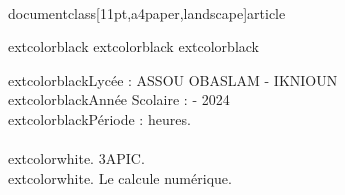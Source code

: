 \\documentclass[11pt,a4paper,landscape]{article}
\begin{document}
extcolor{black}{}
\hfill
extcolor{black}{}
\hfill  
extcolor{black}{}
\begin{boxone}
\begin{multicols}{2} 
extcolor{black}{\myfont Lycée :  } {\sffamily  ASSOU OBASLAM - IKNIOUN}
\\
extcolor{black}{\myfont Année Scolaire  :} { - 2024}
\\
extcolor{black}{\myfont Période :} { heures.}
\\
\\
extcolor{white}{.}\qquad\qquad{} {\sffamily 3APIC.}
\\
extcolor{white}{.}\qquad\qquad{} {\sffamily Le calcule numérique.}
\end{multicols}
\end{boxone}
\end{document}
